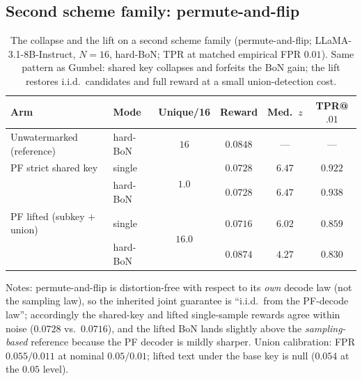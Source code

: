 \documentclass{article} %
\begin{document}
\subsection{Second scheme family: permute-and-flip}
\begin{table}[h]
\caption{The collapse and the lift on a second scheme family
(permute-and-flip; LLaMA-3.1-8B-Instruct, $N{=}16$, hard-BoN; TPR at matched
empirical FPR $0.01$). Same pattern as Gumbel: shared key collapses and
forfeits the BoN gain; the lift restores i.i.d.\ candidates and full reward at
a small union-detection cost.}
\label{tab:pf}
\begin{center}
\small
\begin{tabular}{llcccc}
\toprule
Arm & Mode & Unique/16 & Reward & Med.\ $z$ & TPR@$.01$ \\
\midrule
Unwatermarked (reference) & hard-BoN & $16$ & $0.0848$ & --- & --- \\
\midrule
PF strict shared key & single & \multirow{2}{*}{$1.0$} & $0.0728$ & $6.47$ & $0.922$ \\
 & hard-BoN & & $0.0728$ & $6.47$ & $0.938$ \\
\midrule
PF lifted (subkey $+$ union) & single & \multirow{2}{*}{$16.0$} & $0.0716$ & $6.02$ & $0.859$ \\
 & hard-BoN & & $\mathbf{0.0874}$ & $4.27$ & $0.830$ \\
\bottomrule
\end{tabular}
\end{center}
\end{table}
Notes: permute-and-flip is distortion-free with respect to its \emph{own}
decode law (not the sampling law), so the inherited joint guarantee is
``i.i.d.\ from the PF-decode law''; accordingly the shared-key and lifted
single-sample rewards agree within noise ($0.0728$ vs.\ $0.0716$), and the
lifted BoN lands slightly above the \emph{sampling-based} reference because the PF decoder
is mildly sharper. Union calibration: FPR $0.055/0.011$ at nominal $0.05/0.01$;
lifted text under the base key is null ($0.054$ at the $0.05$ level).
\end{document}
